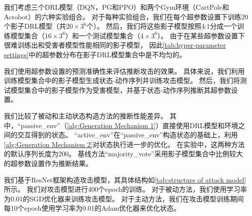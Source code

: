我们考虑三个DRL模型（DQN，PG和PPO）和两个Gym环境（CartPole和Acrobot）的六种实验组合。
对于每种实验组合，我们在每个超参数设置下训练20个影子DRL模型（共$20\times3^6$个）。
然后，我们将这些影子模型按照4:1分成一个训练模型集合（$16\times3^6$）和一个测试模型集合（$4\times3^6$）。
由于在某些超参数设置下很难训练出和受害者模型性能相同的影子模型\cite{MBMGLHSK16}，
因此\autoref{tab:hyper-parameter settings}中的超参数分布在影子DRL模型集合中是不均匀的。

我们使用超参数设置的预测准确性来评估推断攻击的效果\cite{PWZLYS19,CGZXL21,OASF18}。
具体来说，我们利用训练模型集合中的影子模型生成状态-动作序列并训练攻击模型。
然后，我们将测试模型集合中的影子模型作为受害模型，并基于状态-动作序列推断其超参数设置。

我们比较了被动和主动状态构造方法的推断性能差异。
其中，“passive\_env”（\autoref{alg:Generation Mechanism 1}）直接使用DRL模型和环境之间的交互得到的状态。
“active\_env”在“passive\_env”构造状态的基础上，利用\autoref{alg:Generation Mechanism 2}对状态执行进一步的优化。
在实验中，这两种方法的默认序列长度为200。
基线方法“majority\_vote”采用影子模型集合中比例较大的超参数设置作为推断结果。

我们基于ResNet框架构造攻击模型，其具体结构如\autoref{tab:structure of attack model}所示。
我们对攻击模型进行400个epoch的训练。
对于被动方法，我们使用学习率为0.01的SGD优化器来训练攻击模型。
对于主动方法，我们在攻击模型训练期间每10个epoch使用学习率为0.01的Adam优化器来优化状态。

